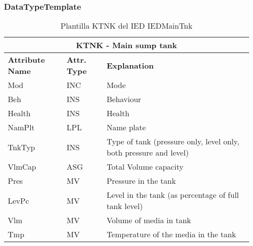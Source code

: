     \subsubsection{DataTypeTemplate}
    \begin{table}[H]
    \begin{center}
    \begin{tabular}{|l|l|p{8.5cm}|}
            \hline
            \multicolumn{3}{|c|}{\cellcolor[gray]{0.8} \textbf{ KTNK}  - Main sump tank} \\
            \hline
            \textbf{Attribute Name} & \textbf{Attr. Type} & \textbf{Explanation} \\
            \hline 
            Mod & INC & Mode \\
            \hline
            Beh & INS & Behaviour \\
            \hline
            Health & INS & Health \\
            \hline
            NamPlt & LPL & Name plate \\
            \hline
            TnkTyp & INS & Type of tank (pressure only, level only, both pressure and level) \\
            \hline
            VlmCap & ASG & Total Volume capacity \\
            \hline
            Pres & MV & Pressure in the tank \\
            \hline
            LevPc & MV & Level in the tank (as percentage of full  tank level) \\
            \hline
            Vlm & MV & Volume of media in tank \\
            \hline
            Tmp & MV & Temperature of the media in the tank \\
            \hline
    \end{tabular}
    \caption{Plantilla KTNK del IED IEDMainTnk}
    \label{table:lnTypeKTNK_1}
    \end{center}
    \end{table}
    
    
    